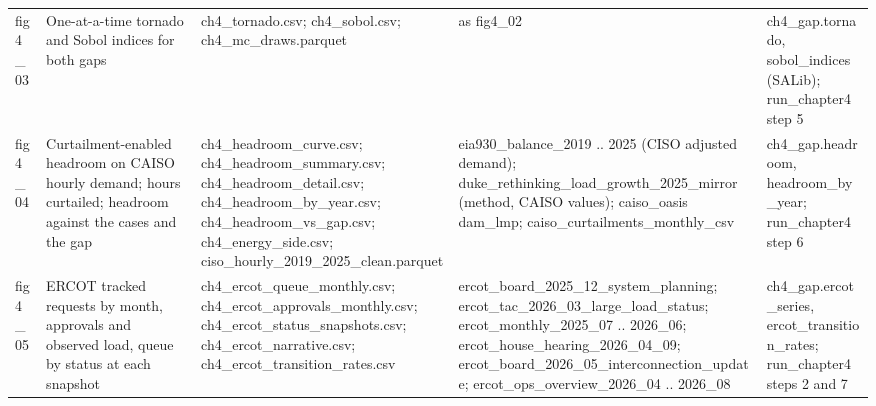 \begin{tabular}{lp{4.6cm}p{5.2cm}p{4.6cm}p{4.8cm}}
fig4\_\allowbreak{}03 & One-at-a-time tornado and Sobol indices for both gaps & ch4\_\allowbreak{}tornado.csv; ch4\_\allowbreak{}sobol.csv; ch4\_\allowbreak{}mc\_\allowbreak{}draws.parquet & as fig4\_\allowbreak{}02 & ch4\_\allowbreak{}gap.tornado, sobol\_\allowbreak{}indices (SALib); run\_\allowbreak{}chapter4 step 5 \\
fig4\_\allowbreak{}04 & Curtailment-enabled headroom on CAISO hourly demand; hours curtailed; headroom against the cases and the gap & ch4\_\allowbreak{}headroom\_\allowbreak{}curve.csv; ch4\_\allowbreak{}headroom\_\allowbreak{}summary.csv; ch4\_\allowbreak{}headroom\_\allowbreak{}detail.csv; ch4\_\allowbreak{}headroom\_\allowbreak{}by\_\allowbreak{}year.csv; ch4\_\allowbreak{}headroom\_\allowbreak{}vs\_\allowbreak{}gap.csv; ch4\_\allowbreak{}energy\_\allowbreak{}side.csv; ciso\_\allowbreak{}hourly\_\allowbreak{}2019\_\allowbreak{}2025\_\allowbreak{}clean.parquet & eia930\_\allowbreak{}balance\_\allowbreak{}2019 .. 2025 (CISO adjusted demand); duke\_\allowbreak{}rethinking\_\allowbreak{}load\_\allowbreak{}growth\_\allowbreak{}2025\_\allowbreak{}mirror (method, CAISO values); caiso\_\allowbreak{}oasis dam\_\allowbreak{}lmp; caiso\_\allowbreak{}curtailments\_\allowbreak{}monthly\_\allowbreak{}csv & ch4\_\allowbreak{}gap.headroom, headroom\_\allowbreak{}by\_\allowbreak{}year; run\_\allowbreak{}chapter4 step 6 \\
fig4\_\allowbreak{}05 & ERCOT tracked requests by month, approvals and observed load, queue by status at each snapshot & ch4\_\allowbreak{}ercot\_\allowbreak{}queue\_\allowbreak{}monthly.csv; ch4\_\allowbreak{}ercot\_\allowbreak{}approvals\_\allowbreak{}monthly.csv; ch4\_\allowbreak{}ercot\_\allowbreak{}status\_\allowbreak{}snapshots.csv; ch4\_\allowbreak{}ercot\_\allowbreak{}narrative.csv; ch4\_\allowbreak{}ercot\_\allowbreak{}transition\_\allowbreak{}rates.csv & ercot\_\allowbreak{}board\_\allowbreak{}2025\_\allowbreak{}12\_\allowbreak{}system\_\allowbreak{}planning; ercot\_\allowbreak{}tac\_\allowbreak{}2026\_\allowbreak{}03\_\allowbreak{}large\_\allowbreak{}load\_\allowbreak{}status; ercot\_\allowbreak{}monthly\_\allowbreak{}2025\_\allowbreak{}07 .. 2026\_\allowbreak{}06; ercot\_\allowbreak{}house\_\allowbreak{}hearing\_\allowbreak{}2026\_\allowbreak{}04\_\allowbreak{}09; ercot\_\allowbreak{}board\_\allowbreak{}2026\_\allowbreak{}05\_\allowbreak{}interconnection\_\allowbreak{}update; ercot\_\allowbreak{}ops\_\allowbreak{}overview\_\allowbreak{}2026\_\allowbreak{}04 .. 2026\_\allowbreak{}08 & ch4\_\allowbreak{}gap.ercot\_\allowbreak{}series, ercot\_\allowbreak{}transition\_\allowbreak{}rates; run\_\allowbreak{}chapter4 steps 2 and 7 \\

\end{tabular}
